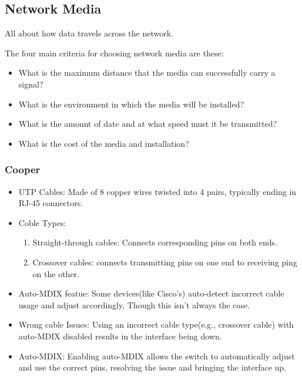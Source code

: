 \documentclass[a4paper,11pt]{article}
\begin{document}
\subsection{Network Media}
All about how data travels across the network.\\

\begin{tcolorbox}[colframe=gray!80, colback=gray!20, coltitle=black, title= Network Media]
     The four main criteria for choosing network media are these:\\
    \begin{itemize}
        \item What is the maximum distance that the media can successfully carry a signal?\\
        \item What is the environment in which the media will be installed?\\
        \item What is the amount of date and at what speed must it be transmitted?\\
        \item What is the cost of the media and installation?\\
    \end{itemize}
    
\end{tcolorbox}
\subsubsection{Cooper}
\begin{itemize}
\item UTP Cables: Made of 8 copper wires twisted into 4 pairs, typically ending in RJ-45 connectors.\\
\item Coble Types:\\
\begin{enumerate}
\item Straight-through cables: Connects corresponding pins on both ends.\\
\item Crossover cables: connects transmitting pins on one end to receiving ping on the other.\\
\end{enumerate}
\item Auto-MDIX featue: Some devices(like Cisco's) auto-detect incorrect cable usage and adjust accordingly, Though this isn't always the case.\\
\item Wrong cable Issues: Using an incorrect cable type(e.g., crossover cable) with auto-MDIX disabled results in the interface being down.\\
\item Auto-MDIX: Enabling auto-MDIX allows the switch to automatically adjust and use the correct pins, resolving the issue and bringing the interface up.\\
\end{itemize}
\end{document}

